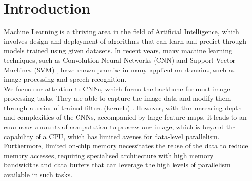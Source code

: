 \documentclass[a4paper,12pt, final]{report}
\begin{document}
\clearpage 
\renewcommand{\abstractname}{Abstract} 

\tableofcontents
  \listoffigures
  \listoftables



\chapter{Introduction}

Machine Learning is a thriving area in the field of Artificial Intelligence, which involves design and deployment of algorithms that can learn and predict through models trained using given datasets. In recent years, many machine learning techniques, such as Convolution Neural Networks (CNN) \cite{CNNs} and Support Vector Machines (SVM) \cite{SVMs}, have shown promise in many application domains, such as image processing \cite{LeNet,CNN1,CNN2,GoogleNet,ALexNet,ResNet,YOLO,CNN3,CNN7,CNN5} and speech recognition. 
\\

We focus our attention to CNNs, which forms the backbone for most image processing tasks. They are able to capture the image data and modify them through a series of trained filters (kernels) \cite{CNNs}. However, with the increasing depth and complexities of the CNNs, accompanied by large feature maps, it leads to an enormous amounts of computation to process one image, which is beyond the capability of a CPU, which has limited avenes for data-level parallelism. Furthermore, limited on-chip memory necessitates the reuse of the data to reduce memory accesses, requiring specialised architecture with high memory bandwidths and data buffers that can leverage the high levels of parallelism available in such tasks.
\\
\end{document}
